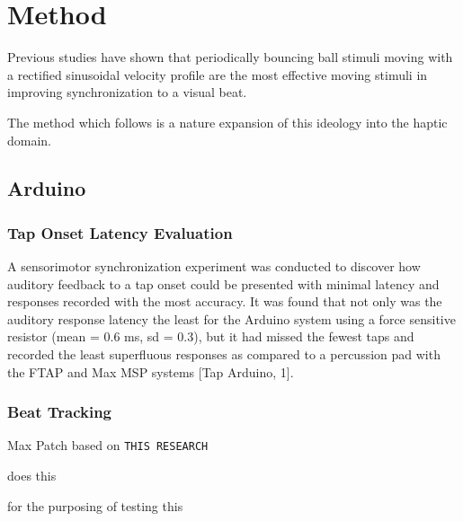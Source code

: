 \chapter{Method}


Previous studies have shown that periodically bouncing ball stimuli moving with a rectified sinusoidal velocity profile are the most effective moving stimuli in improving synchronization to a visual beat.~\cite{gan2015synchronization}

The method which follows is a nature expansion of this ideology into the haptic domain.


\section{Arduino}
\subsection{Tap Onset Latency Evaluation}

A sensorimotor synchronization experiment was conducted to discover how auditory feedback to a tap onset could be presented with minimal latency and responses recorded with the most accuracy. It was found that not only was the auditory response latency the least for the Arduino system using a force sensitive resistor (mean = 0.6 ms, sd = 0.3), but it had missed the fewest taps and recorded the least superfluous responses as compared to a percussion pad with the FTAP and Max MSP systems [Tap Arduino, 1].

\subsection{Beat Tracking}

Max Patch based on \verb!THIS RESEARCH! 

does this

for the purposing of testing this

